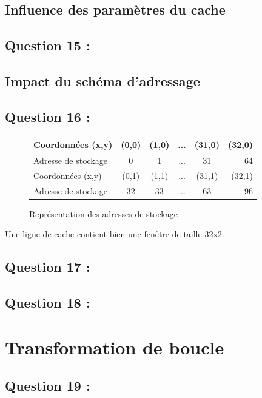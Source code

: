 \documentclass[11pt,a4paper]{article}
\begin{document}
	\subsection{Influence des paramètres du cache}
	\subsection{Question 15 :}

	\subsection{Impact du schéma d’adressage}
	\subsection{Question 16 :}

	\begin{figure}[h]
		\centering
		\begin{tabular}{|l|c|c|c|c|r|}
			\hline
			Coordonnées (x,y) & (0,0) & (1,0) & ... & (31,0) & (32,0) \\
			\hline
			Adresse de stockage & 0 & 1 & ... & 31 & 64 \\
			\hline
			Coordonnées (x,y) & (0,1) & (1,1) & ... & (31,1) & (32,1) \\
			\hline
			Adresse de stockage & 32 & 33 & ... & 63 & 96 \\
			\hline
		\end{tabular}
		\caption{Représentation des adresses de stockage}
	\end{figure}

	Une ligne de cache contient bien une fenêtre de taille 32x2.

	\subsection{Question 17 :}

	\subsection{Question 18 :}

	\section{Transformation de boucle}
	\subsection{Question 19 :}
\end{document}
